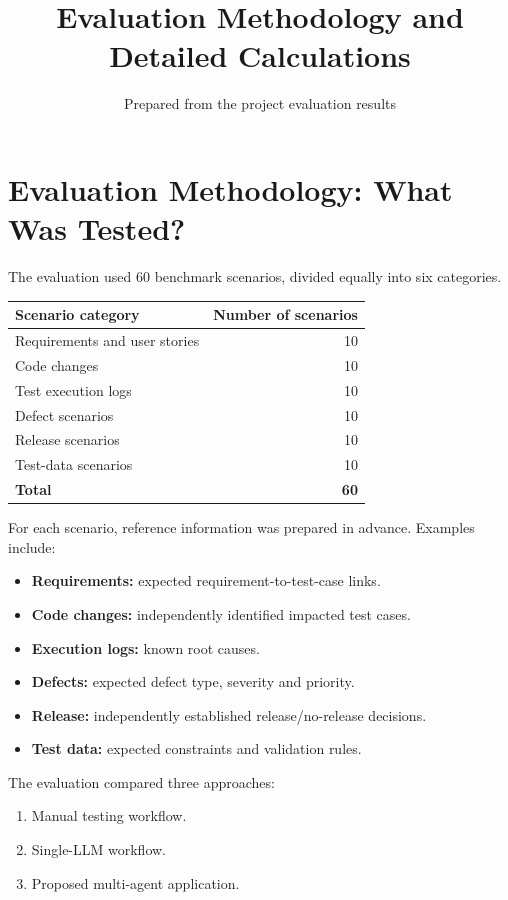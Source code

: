 \documentclass[11pt,a4paper]{article}
\title{\color{Navy}\bfseries Evaluation Methodology and Detailed Calculations}
\author{Prepared from the project evaluation results}
\date{}
\begin{document}
\maketitle
\tableofcontents
\newpage

\section{Evaluation Methodology: What Was Tested?}

The evaluation used 60 benchmark scenarios, divided equally into six categories.

\begin{center}
\begin{tabularx}{0.9\textwidth}{Xr}
\toprule
\textbf{Scenario category} & \textbf{Number of scenarios}\\
\midrule
Requirements and user stories & 10\\
Code changes & 10\\
Test execution logs & 10\\
Defect scenarios & 10\\
Release scenarios & 10\\
Test-data scenarios & 10\\
\midrule
\textbf{Total} & \textbf{60}\\
\bottomrule
\end{tabularx}
\end{center}

For each scenario, reference information was prepared in advance. Examples include:
\begin{itemize}
  \item \textbf{Requirements:} expected requirement-to-test-case links.
  \item \textbf{Code changes:} independently identified impacted test cases.
  \item \textbf{Execution logs:} known root causes.
  \item \textbf{Defects:} expected defect type, severity and priority.
  \item \textbf{Release:} independently established release/no-release decisions.
  \item \textbf{Test data:} expected constraints and validation rules.
\end{itemize}

The evaluation compared three approaches:
\begin{enumerate}
  \item Manual testing workflow.
  \item Single-LLM workflow.
  \item Proposed multi-agent application.
\end{enumerate}
\end{document}
